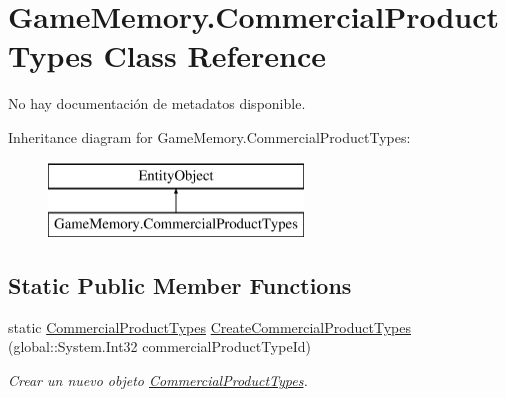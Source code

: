 \hypertarget{class_game_memory_1_1_commercial_product_types}{\section{Game\-Memory.\-Commercial\-Product\-Types Class Reference}
\label{class_game_memory_1_1_commercial_product_types}
}


No hay documentación de metadatos disponible.  


Inheritance diagram for Game\-Memory.\-Commercial\-Product\-Types\-:\begin{figure}[H]
\begin{center}
\leavevmode
\includegraphics[height=2.000000cm]{class_game_memory_1_1_commercial_product_types}
\end{center}
\end{figure}
\subsection*{Static Public Member Functions}
\begin{DoxyCompactItemize}
\item 
static \hyperlink{class_game_memory_1_1_commercial_product_types}{Commercial\-Product\-Types} \hyperlink{class_game_memory_1_1_commercial_product_types_a5efd99db95615eb5d00bd41dee79dcfd}{Create\-Commercial\-Product\-Types} (global\-::\-System.\-Int32 commercial\-Product\-Type\-Id)
\begin{DoxyCompactList}\small\item\em Crear un nuevo objeto \hyperlink{class_game_memory_1_1_commercial_product_types}{Commercial\-Product\-Types}. \end{DoxyCompactList}\end{DoxyCompactItemize}
